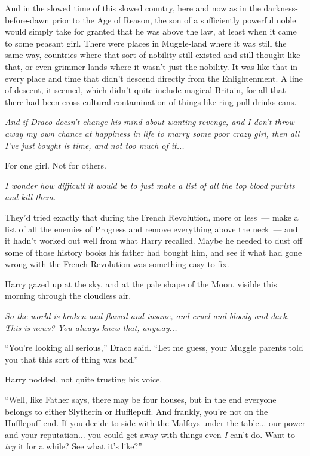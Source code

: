 And in the slowed time of this slowed country, here and now as in the darkness-before-dawn prior to the Age of Reason, the son of a sufficiently powerful noble would simply take for granted that he was above the law, at least when it came to some peasant girl. There were places in Muggle-land where it was still the same way, countries where that sort of nobility still existed and still thought like that, or even grimmer lands where it wasn't just the nobility. It was like that in every place and time that didn't descend directly from the Enlightenment. A line of descent, it seemed, which didn't quite include magical Britain, for all that there had been cross-cultural contamination of things like ring-pull drinks cans.

\emph{And if Draco doesn't change his mind about wanting revenge, and I don't throw away my own chance at happiness in life to marry some poor crazy girl, then all I've just bought is time, and not too much of it...}

For one girl. Not for others.

\emph{I wonder how difficult it would be to just make a list of all the top blood purists and kill them.}

They'd tried exactly that during the French Revolution, more or less~--- make a list of all the enemies of Progress and remove everything above the neck~--- and it hadn't worked out well from what Harry recalled. Maybe he needed to dust off some of those history books his father had bought him, and see if what had gone wrong with the French Revolution was something easy to fix.

Harry gazed up at the sky, and at the pale shape of the Moon, visible this morning through the cloudless air.

\emph{So the world is broken and flawed and insane, and cruel and bloody and dark. This is news? You always knew that, anyway...}

``You're looking all serious,'' Draco said. ``Let me guess, your Muggle parents told you that this sort of thing was bad.''

Harry nodded, not quite trusting his voice.

``Well, like Father says, there may be four houses, but in the end everyone belongs to either Slytherin or Hufflepuff. And frankly, you're not on the Hufflepuff end. If you decide to side with the Malfoys under the table... our power and your reputation... you could get away with things even \emph{I} can't do. Want to \emph{try} it for a while? See what it's like?''

